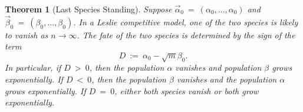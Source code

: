 \documentclass[11pt,reqno]{amsart}
\numberwithin{equation}{section}
\theoremstyle{plain}
\newtheorem{theorem}[thm]{Theorem}
\begin{document}
\begin{theorem}[Last Species Standing] \label{thm:lastspecies}
    Suppose $\vec \alpha_0 \ = \ (\alpha_0, \dots, \alpha_0)$ and 
    $\vec \beta_0 \ = \  (\beta_0, \dots, \beta_0)$.
    In a Leslie competitive model, one of the two 
    species is likely to vanish as $n \rightarrow \infty$. The fate of the two species is determined by the sign of the term 
    \begin{equation}
        D \ :=\ \alpha_0 - \sqrt{m} \beta_0.
    \end{equation}
    In particular, if $D \ > \  0$, then the population $\alpha$ vanishes and population $\beta$ grows exponentially. If $D \ < \  0$, then the population $\beta$ vanishes and the population $\alpha$ grows exponentially. If $D \ = \  0$, either both species vanish or both grow exponentially. 
\end{theorem}
\end{document}

